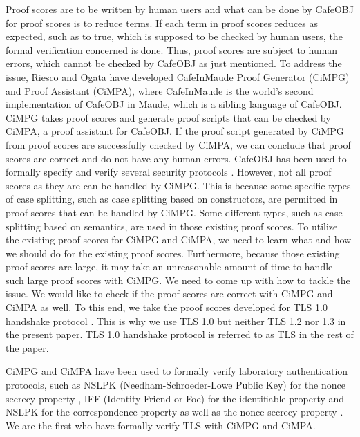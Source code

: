 \documentclass[a4paper,fleqn]{cas-dc}
\begin{document}
Proof scores are to be written by human users and what can be done by CafeOBJ for proof scores is to reduce terms. If each term in proof scores reduces as expected, such as to true, which is supposed to be checked by human users, the formal verification concerned is done. Thus, proof scores are subject to human errors, which cannot be checked by CafeOBJ as just mentioned. To address the issue, Riesco and Ogata \cite{RiescoO18tosem} have developed CafeInMaude Proof Generator (CiMPG) and Proof Assistant (CiMPA), where CafeInMaude is the world's second implementation of CafeOBJ in Maude, which is a sibling language of CafeOBJ. CiMPG takes proof scores and generate proof scripts that can be checked by CiMPA, a proof assistant for CafeOBJ. If the proof script generated by CiMPG from proof scores are successfully checked by CiMPA, we can conclude that proof scores are correct and do not have any human errors. CafeOBJ has been used to formally specify and verify several security protocols \cite{10.5555/1765533.1765569, 10.5555/646542.696196, 1357944, ogata05}. However, not all proof scores as they are can be handled by CiMPG. This is because some specific types of case splitting, such as case splitting based on constructors, are permitted in proof scores that can be handled by CiMPG. Some different types, such as case splitting based on semantics, are used in those existing proof scores. To utilize the existing proof scores for CiMPG and CiMPA, we need to learn what and how we should do for the existing proof scores. Furthermore, because those existing proof scores are large, it may take an unreasonable amount of time to handle such large proof scores with CiMPG. We need to come up with how to tackle the issue. We would like to check if the proof scores are correct with CiMPG and CiMPA as well. To this end, we take the proof scores developed for TLS 1.0 handshake protocol \cite{ogata05}. This is why we use TLS 1.0 but neither TLS 1.2 nor 1.3 in the present paper. TLS 1.0 handshake protocol is referred to as TLS in the rest of the paper.

CiMPG and CiMPA have been used to formally verify laboratory authentication protocols, such as NSLPK (Needham-Schroeder-Lowe Public Key) for the nonce secrecy property \cite{RiescoO18tosem}, IFF (Identity-Friend-or-Foe) for the identifiable property \cite{twmon} and NSLPK for the correspondence property as well as the nonce secrecy property \cite{twmon}. We are the first who have formally verify TLS with CiMPG and CiMPA.
\end{document}
